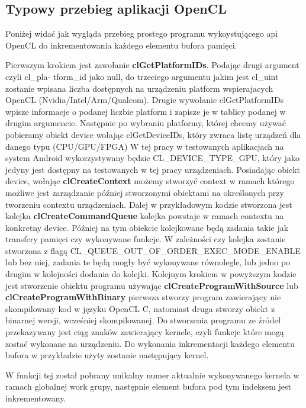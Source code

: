 \subsection{Typowy przebieg aplikacji OpenCL}
Poniżej widać jak wygląda przebieg prostego programu wykoystującego api OpenCL do inkrementowania każdego elementu bufora pamięci.



Pierwszym krokiem jest zawołanie \textbf{clGetPlatformIDs}. Podając drugi argument czyli cl\_pla- tform\_id jako null, do trzeciego argumentu jakim jest cl\_uint\* zostanie wpisana liczba dostępnych na urządzeniu platform wspierajacych OpenCL (Nvidia/Intel/Arm/Qualcom).
Drugie wywołanie clGetPlatformIDs wpisze informacje o podanej liczbie platform i zapisze je w tablicy podanej w drugim argumencie.
Następnie po wybraniu platformy, której chcemy używać pobieramy obiekt device wołając clGetDeviceIDs, który zwraca listę urządzeń dla danego typu (CPU/GPU/FPGA)
W tej pracy w testowanych aplikacjach na system Android wykorzystywany będzie CL\_DEVICE\_TYPE\_GPU, który jako jedyny jest dostępny na testowanych w tej pracy urządzeniach.
Posiadając obiekt device, wołając \textbf{clCreateContext} możemy stworzyć context w ramach którego możliwe jest zarządzanie później stworzonymi obiektami na określonych przy tworzeniu contextu urządzeniach.
Dalej w przykładowym kodzie stworzona jest kolejka \textbf{clCreateCommandQueue} kolejka powstaje w ramach contextu na konkretny device. Później na tym obiekcie kolejkowane będą zadania takie jak transfery pamięci czy wykonywane funkcje. W zależności czy kolejka zostanie stworzona z flagą CL\_QUEUE\_OUT\_OF\_ORDER\_EXEC\_MODE\_ENABLE lub bez niej, zadania te będą mogły być wykonywane równolegle, lub jedno po drugim w kolejności dodania do kolejki.
Kolejnym krokiem w powyższym kodzie jest stworzenie obiektu programu używając \textbf{clCreateProgramWithSource} lub \textbf{clCreateProgramWithBinary} pierwsza stworzy program zawierający nie skompilowany kod w języku OpenCL C, natomiast druga stworzy obiekt z binarnej wersji, wcześniej skompilowanej. Do stworzenia programu ze źródeł przekazywany jest ciąg znaków zawierający kernele, czyli funkcje które mogą zostać wykonane na urządzeniu.
Do wykonania inkrementacji każdego elementu bufora w przykładzie użyty zostanie następujący kernel.

W funkcji tej został pobrany unikalny numer aktualnie wykonywanego kernela w ramach globalnej work grupy, następnie element bufora pod tym indeksem jest inkrementowany. 
